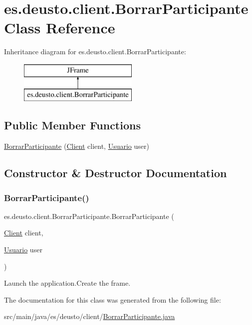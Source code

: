 \hypertarget{classes_1_1deusto_1_1client_1_1_borrar_participante}{}\section{es.\+deusto.\+client.\+Borrar\+Participante Class Reference}
\label{classes_1_1deusto_1_1client_1_1_borrar_participante}
Inheritance diagram for es.\+deusto.\+client.\+Borrar\+Participante\+:\begin{figure}[H]
\begin{center}
\leavevmode
\includegraphics[height=2.000000cm]{classes_1_1deusto_1_1client_1_1_borrar_participante}
\end{center}
\end{figure}
\subsection*{Public Member Functions}
\begin{DoxyCompactItemize}
\item 
\mbox{\hyperlink{classes_1_1deusto_1_1client_1_1_borrar_participante_a97c9431ed8d323618d8e34078d3a7955}{Borrar\+Participante}} (\mbox{\hyperlink{classes_1_1deusto_1_1client_1_1_client}{Client}} client, \mbox{\hyperlink{classes_1_1deusto_1_1server_1_1jdo_1_1_usuario}{Usuario}} user)
\end{DoxyCompactItemize}


\subsection{Constructor \& Destructor Documentation}
\mbox{\label{classes_1_1deusto_1_1client_1_1_borrar_participante_a97c9431ed8d323618d8e34078d3a7955}} 
\subsubsection{\texorpdfstring{BorrarParticipante()}{BorrarParticipante()}}
{\footnotesize\ttfamily es.\+deusto.\+client.\+Borrar\+Participante.\+Borrar\+Participante (\begin{DoxyParamCaption}\item[{\mbox{\hyperlink{classes_1_1deusto_1_1client_1_1_client}{Client}}}]{client,  }\item[{\mbox{\hyperlink{classes_1_1deusto_1_1server_1_1jdo_1_1_usuario}{Usuario}}}]{user }\end{DoxyParamCaption})}

Launch the application.\+Create the frame. 

The documentation for this class was generated from the following file\+:\begin{DoxyCompactItemize}
\item 
src/main/java/es/deusto/client/\mbox{\hyperlink{_borrar_participante_8java}{Borrar\+Participante.\+java}}\end{DoxyCompactItemize}
